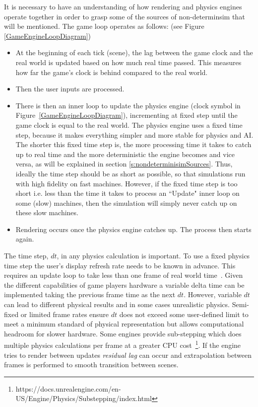 It is necessary to have an understanding of how rendering and physics engines operate together in order to grasp some of the sources of non-determinsim that will be mentioned. %
The game loop operates as follows: (see Figure \ref{GameEngineLoopDiagram})
\begin{itemize}[leftmargin=*]
    \item At the beginning of each tick (scene), the lag between the game clock and the real world is updated based on how much real time passed. This measures how far the game's clock is behind compared to the real world.
    \item Then the user inputs are processed.
    \item There is then an inner loop to update the physics engine (clock symbol in Figure~\ref{GameEngineLoopDiagram}), incrementing at fixed step until the game clock is equal to the real world. The physics engine uses a fixed time step, because it makes everything simpler and more stable for physics and AI. The shorter this fixed time step is, the more processing time it takes to catch up to real time and the more deterministic the engine becomes and vice versa, as will be explained in section \ref{s:nondeterminisimSources}. Thus, ideally the time step should be as short as possible, so that simulations run with high fidelity on fast machines. However, if the fixed time step is too short i.e. less than the time it takes to process an ``Update" inner loop on some (slow) machines, then the simulation will simply never catch up on these slow machines.
    \item Rendering occurs once the physics engine catches up. The process then starts again.
\end{itemize} 



The time step, $dt$, in any physics calculation is important. To use a fixed physics time step the user's display refresh rate needs to be known in advance. This requires an update loop to take less than one frame of real world time~\cite{gaffer}. Given the different capabilities of game players hardware a variable delta time can be implemented taking the previous frame time as the next $dt$. However, variable $dt$ can lead to different physical results and in some cases unrealistic physics. Semi-fixed or limited frame rates ensure $dt$ does not exceed some user-defined limit to meet a minimum standard of physical representation but allows computational headroom for slower hardware. Some engines provide sub-stepping which does multiple physics calculations per frame at a greater CPU cost~\footnote{https://docs.unrealengine.com/en-US/Engine/Physics/Substepping/index.html}. If the engine tries to render between updates \textit{residual lag} can occur and extrapolation between frames is performed to smooth transition between scenes.%



